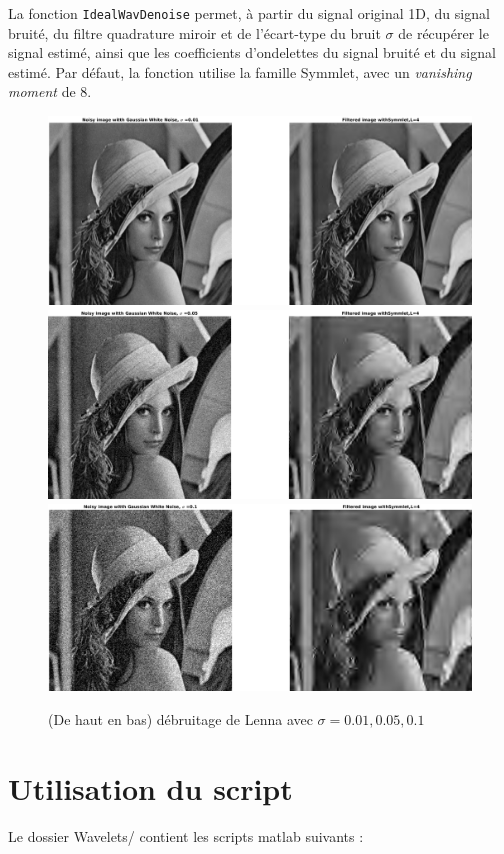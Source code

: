 \documentclass[a4paper,12pt, openany, twoside]{article}
\theoremstyle{break}
\begin{document}
La fonction \texttt{IdealWavDenoise} permet, à partir du signal original 1D, du signal bruité, du filtre quadrature miroir et de l'écart-type du bruit $\sigma$ de récupérer le signal estimé, ainsi que les coefficients d'ondelettes du signal bruité et du signal estimé. Par défaut, la fonction utilise la famille Symmlet, avec un \textit{vanishing moment} de 8.

\begin{figure}[!htpb]
  \centering
  \includegraphics[width=\textwidth]{denoise_lenna1}\vfill
  \includegraphics[width=\textwidth]{denoise_lenna5}\vfill
  \includegraphics[width=\textwidth]{denoise_lenna10}\vfill
  \caption{(De haut en bas) débruitage de Lenna avec $\sigma=0.01, 0.05, 0.1$}
\end{figure}
\clearpage

\section{Utilisation du script}
Le dossier Wavelets/ contient les scripts matlab suivants :
\end{document}
